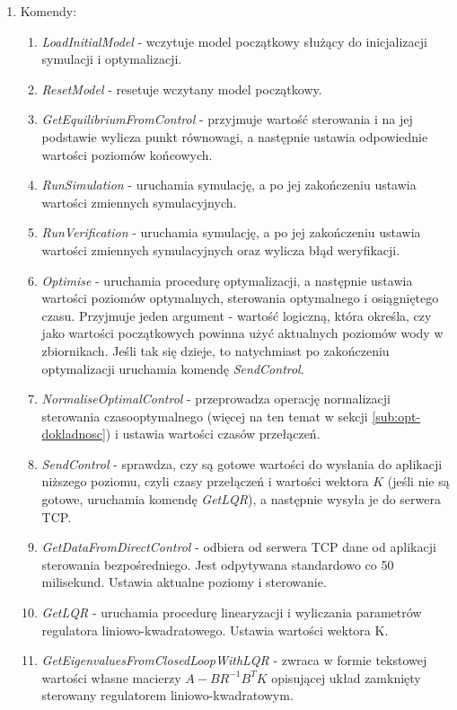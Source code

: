 \begin{enumerate}
\begin{enumerate}
\begin{enumerate}
        \end{enumerate}
    \end{enumerate}
    \item Komendy:
    \begin{enumerate}
        \item \emph{LoadInitialModel} - wczytuje model początkowy służący do inicjalizacji symulacji i optymalizacji.
        \item \emph{ResetModel} - resetuje wczytany model początkowy.
        \item \emph{GetEquilibriumFromControl} - przyjmuje wartość sterowania i na jej podstawie wylicza punkt równowagi, a następnie ustawia odpowiednie wartości poziomów końcowych.
        \item \emph{RunSimulation} - uruchamia symulację, a po jej zakończeniu ustawia wartości zmiennych symulacyjnych.
        \item \emph{RunVerification} - uruchamia symulację, a po jej zakończeniu ustawia wartości zmiennych symulacyjnych oraz wylicza błąd weryfikacji.
        \item \emph{Optimise} - uruchamia procedurę optymalizacji, a następnie ustawia wartości poziomów optymalnych, sterowania optymalnego i osiągniętego czasu. Przyjmuje jeden argument - wartość logiczną, która określa, czy jako wartości początkowych powinna użyć aktualnych poziomów wody w zbiornikach. Jeśli tak się dzieje, to natychmiast po zakończeniu optymalizacji uruchamia komendę \emph{SendControl}.
        \item \emph{NormaliseOptimalControl} - przeprowadza operację normalizacji sterowania czasooptymalnego (więcej na ten temat w sekcji \ref{sub:opt-dokladnosc}) i ustawia wartości czasów przełączeń.
        \item \emph{SendControl} - sprawdza, czy są gotowe wartości do wysłania do aplikacji niższego poziomu, czyli czasy przełączeń i wartości wektora $K$ (jeśli nie są gotowe, uruchamia komendę \emph{GetLQR}), a następnie wysyła je do serwera TCP.
        \item \emph{GetDataFromDirectControl} - odbiera od serwera TCP dane od aplikacji sterowania bezpośredniego. Jest odpytywana standardowo co 50 milisekund. Ustawia aktualne poziomy i sterowanie.
        \item \emph{GetLQR} - uruchamia procedurę linearyzacji i wyliczania parametrów regulatora liniowo-kwadratowego. Ustawia wartości wektora K.
        \item \emph{GetEigenvaluesFromClosedLoopWithLQR} - zwraca w formie tekstowej wartości własne macierzy $A - BR^{-1}B^{T}K$ opisującej układ zamknięty sterowany regulatorem liniowo-kwadratowym.
    \end{enumerate}
\end{enumerate}

